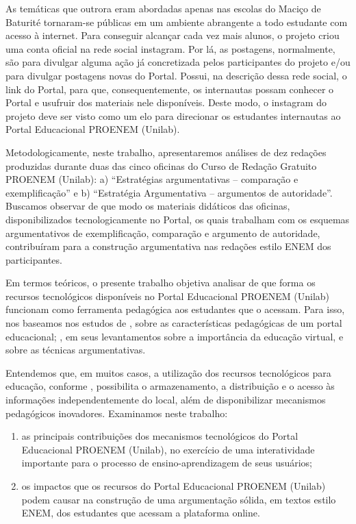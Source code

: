 \documentclass{textolivre}
\begin{document}
As temáticas que outrora eram abordadas apenas nas escolas do Maciço de Baturité tornaram-se públicas em um ambiente abrangente a todo estudante com acesso à internet. Para conseguir alcançar cada vez mais alunos, o projeto criou uma conta oficial na rede social instagram. Por lá, as postagens, normalmente, são para divulgar alguma ação já concretizada pelos participantes do projeto e/ou para divulgar postagens novas do Portal.  Possui, na descrição dessa rede social, o link do Portal, para que, consequentemente, os internautas possam conhecer o Portal e usufruir dos materiais nele disponíveis. Deste modo, o instagram do projeto deve ser visto como um elo para direcionar os estudantes internautas ao Portal Educacional PROENEM (Unilab). 

Metodologicamente, neste trabalho, apresentaremos análises de dez redações produzidas durante duas das cinco oficinas do Curso de Redação Gratuito PROENEM (Unilab): a) “Estratégias argumentativas – comparação e exemplificação” e b) “Estratégia Argumentativa – argumentos de autoridade”. Buscamos observar de que modo os materiais didáticos das oficinas, disponibilizados tecnologicamente no Portal, os quais trabalham com os esquemas argumentativos de exemplificação, comparação e argumento de autoridade, contribuíram para a construção argumentativa nas redações estilo ENEM dos participantes.

Em termos teóricos, o presente trabalho objetiva analisar de que forma os recursos tecnológicos disponíveis no Portal Educacional PROENEM (Unilab) funcionam como ferramenta pedagógica aos estudantes que o acessam. Para isso, nos baseamos nos estudos de \textcite{bottentuitjunior2013}, sobre as características pedagógicas de um portal educacional; \textcite{iahn2001}, em seus levantamentos sobre a importância da educação virtual, e \textcite{perelman1996} sobre as técnicas argumentativas. 

Entendemos que, em muitos casos, a utilização dos recursos tecnológicos para educação, conforme \textcite{garantizadojunior2016}, possibilita o armazenamento, a distribuição e o acesso às informações independentemente do local, além de disponibilizar mecanismos pedagógicos inovadores. Examinamos neste trabalho:

\begin{enumerate}[label=(\alph*)]
\item as principais contribuições dos mecanismos tecnológicos do Portal Educacional PROENEM (Unilab), no exercício de uma interatividade importante para o processo de ensino-aprendizagem de seus usuários;
\item os impactos que os recursos do Portal Educacional PROENEM (Unilab) podem causar na construção de uma argumentação sólida, em textos estilo ENEM, dos estudantes que acessam a plataforma online.
\end{enumerate}
\end{document}

